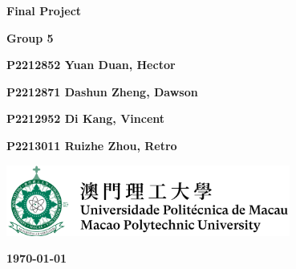 \documentclass[11pt, a4paper]{article}
\begin{document}
\begin{titlepage}
    \begin{center}
        \vspace*{1.5cm}
            
        \Huge
        \textbf{Final Project}
            
        \vspace{3cm}    
        \huge
        
        
            
        \vspace{2cm}
        \Large
            
        \textbf{Group 5}                                         %

        \vspace{1.5cm}

        \textbf{P2212852 Yuan Duan, Hector}                      %

        \textbf{P2212871 Dashun Zheng, Dawson}                   %

        \textbf{P2212952 Di Kang, Vincent}                       %

        \textbf{P2213011 Ruizhe Zhou, Retro}                     %
        
        
        \vfill
        
        
            
        \vspace{1cm}
            
        \includegraphics[width=0.7\textwidth]{logo-mpu.png}
        \\
        
        \Large
        
        \textbf{\today}
            
    \end{center}
\end{titlepage}

\newpage
\end{document}
